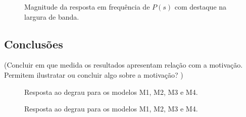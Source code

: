 \begin{figure}[!ht]
    \caption{Magnitude da resposta em frequência de $P(s)$
    com destaque na largura de banda.}
    \vspace{-10pt}
    \hspace{-30pt}
    \label{fig:desafio-3:questao-3-4}
    \begin{minipage}{\linewidth}
        
    \end{minipage}
\end{figure}

\subsection{Conclusões}
(Concluir em que medida os resultados apresentam relação com a motivação.
Permitem ilustratar ou concluir algo sobre a motivação? )


\begin{figure}[!ht]
    \caption{Resposta ao degrau para os modelos M1, M2, M3 e M4.}
    \vspace{-10pt}
    \hspace{-30pt}
    \label{fig:desafio2:questao5}
    \begin{minipage}{\linewidth}
        
    \end{minipage}
\end{figure}

\begin{figure}[!ht]
    \caption{Resposta ao degrau para os modelos M1, M2, M3 e M4.}
    \vspace{-10pt}
    \hspace{-30pt}
    \label{fig:desafio2:questao-7}
    \begin{minipage}{\linewidth}
        
    \end{minipage}
\end{figure}